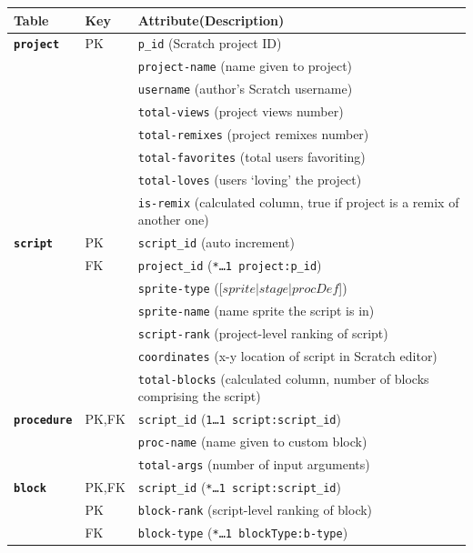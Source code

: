 \documentclass[10pt, conference]{IEEEtran}
\begin{document}
\begin{table}[]
	\centering
	\begin{tabular}{llp{5.4cm}}
		\textbf{Table}& \textbf{Key} & \textbf{Attribute(Description)}\\
		\hline
		\textbf{\texttt{project}} & PK & \texttt{p\_id} (Scratch project ID)\\
		&  & 							\texttt{project-name} (name given to project)\\
		&  & 							\texttt{username} (author's Scratch 
		username)\\
		&  & 							\texttt{total-views} (project views number)\\
		&  & 							\texttt{total-remixes} (project remixes number)\\
		&  & 							\texttt{total-favorites} (total users favoriting)\\
		&  & 							\texttt{total-loves} (users `loving' the project)\\
		& & 							\texttt{is-remix} (calculated column, true if project is a remix of another one)\\
		\hline
		\textbf{\texttt{script}} & PK & \texttt{script\_id} (auto increment)\\
		& FK & 							\texttt{project\_id} (\texttt{\scriptsize{*\ldots1 project:p\_id}})\\
		& & 							\texttt{sprite-type} ([$sprite \vert stage \vert procDef$])\\
		& & 							\texttt{sprite-name} (name sprite the script is in)\\
		& & 							\texttt{script-rank} (project-level ranking of script)\\
		& & 							\texttt{coordinates} (x-y location of script in Scratch editor)\\
		& & 							\texttt{total-blocks} (calculated column, number of blocks comprising the script)\\
		\hline
		\textbf{\texttt{procedure}} & PK,FK & \texttt{script\_id} (\texttt{\scriptsize{1\ldots1 script:script\_id}})\\
		& & 							\texttt{proc-name} (name given to custom block)\\
		& & 							\texttt{total-args} (number of input arguments)\\
		\hline
		\textbf{\texttt{block}} & PK,FK  & \texttt{script\_id} (\texttt{\scriptsize{*\ldots1 script:script\_id}})\\
		& PK & \texttt{block-rank} (script-level ranking of block)\\
		& FK & \texttt{block-type} (\texttt{\scriptsize{*\ldots1 blockType:b-type}})\\

\end{tabular}
\end{table}
\end{document}
